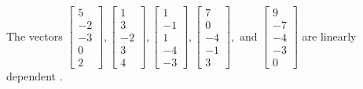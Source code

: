 \begin{exercise}
\begin{exerciseStatement}
  \end{exerciseStatement}
  \begin{exerciseAnswer}
   The vectors \(\left[\begin{array}{r}
5 \\
-2 \\
-3 \\
0 \\
2
\end{array}\right] , \left[\begin{array}{r}
1 \\
3 \\
-2 \\
3 \\
4
\end{array}\right] , \left[\begin{array}{r}
1 \\
-1 \\
1 \\
-4 \\
-3
\end{array}\right] , \left[\begin{array}{r}
7 \\
0 \\
-4 \\
-1 \\
3
\end{array}\right] , \text{ and } \left[\begin{array}{r}
9 \\
-7 \\
-4 \\
-3 \\
0
\end{array}\right]\) are 
  	 linearly dependent  .
  


  \end{exerciseAnswer}
\end{exercise}
